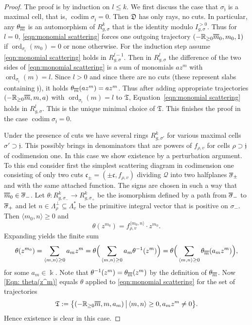 \documentclass[11pt,letter]{amsart}
\theoremstyle{definition}
\theoremstyle{remark}
\numberwithin{equation}{section}
\numberwithin{figure}{section}
\newcommand{\doublebar}[1]{\shortstack{$\overline{\hphantom{#1}}
	$\\[-4pt] $\overline{#1}$}}
\newcommand{\RR} {\mathbb{R}}
\newcommand {\shQ}  {\mathcal{Q}}
\newcommand {\foT}  {\mathfrak{T}}
\newcommand {\foc}  {\mathfrak{c}}
\newcommand {\foj}  {\mathfrak{j}}
\newcommand {\codim} {\operatorname{codim}}
\newcommand {\kk} {\Bbbk}
\newcommand {\ord}  {\operatorname{ord}}
\newcommand {\D} {\mathfrak D}
\begin{document}
\begin{proof}
The proof is by induction on $l\le k$. We first discuss the case that
$\sigma_\foj$ is a maximal cell, that is, $\codim \sigma_\foj=0$. Then $\D$
has only rays, no cuts. In particular, any $\theta_{\scriptsize\doublebar m}$ is
an automorphism of $R^k_{g,\sigma}$ that is the identity modulo
$I_{g,\sigma}^{>0}$. Thus for $l=0$, \eqref{eqn:monomial scattering} forces one
outgoing trajectory $(-\RR_{\ge 0}\doublebar m_0,m_0,1)$ if
$\ord_{\sigma_\foj}(m_0)=0$ or none otherwise. For the induction step assume
\eqref{eqn:monomial scattering} holds in $R^{l-1}_{g,\sigma}$. Then in
$R^l_{g,\sigma}$ the difference of the two sides of \eqref{eqn:monomial
scattering} is a sum of monomials $a z^m$ with $\ord_{\sigma_\foj} (m)=l$. Since
$l>0$ and since there are no cuts (these represent slabs containing $\foj$), it
holds $\theta_{\scriptsize\doublebar m}(a z^m)=a z^m$. Thus after adding
appropriate trajectories $(-\RR_{\ge0}\doublebar m,m,a)$ with
$\ord_{\sigma_\foj}(m)=l$ to $\foT$, Equation~\eqref{eqn:monomial scattering}
holds in $R^l_{g,\sigma}$. This is the unique minimal choice of $\foT$. This finishes the proof in the case $\codim\sigma_\foj=0$.

Under the presence of cuts we have several rings $R^k_{g,\sigma'}$ for various
maximal cells $\sigma'\supset\foj$. This possibly brings in denominators that
are powers of $f_{\rho,v}$ for cells $\rho\supset \foj$ of codimension one. In
this case we show existence by a perturbation argument. To this end consider
first the simplest scattering diagram in codimension one consisting of only two
cuts $\foc_\pm=(\pm \foc,f_{\rho,v})$ dividing $\shQ$ into two halfplanes
$\doublebar\sigma_\pm$ and with the same attached function. The signs are chosen
in such a way that $\doublebar m_0\in \doublebar \sigma_-$. Let $\theta:
R^k_{g,\sigma_-}\to R^k_{g,\sigma_+}$ be the isomorphism defined by a path from
$\doublebar \sigma_-$ to $\doublebar \sigma_+$ and let
$n\in\Lambda_\rho^\perp\subseteq \Lambda_v^*$ be the primitive integral vector
that is positive on $\sigma_-$. Then $\langle m_0,n \rangle \ge 0$ and
\[
\theta(z^{m_0})= f_{\rho,v}^{\langle  m_0,n\rangle} \cdot z^{m_0}.
\]
Expanding yields the finite sum
\begin{equation}
\label{Eqn: theta(z^m)}
\theta(z^{m_0})= \sum_{\langle m,n\rangle\ge 0} a_m z^m
= \theta\Big(\sum_{\langle m,n\rangle\ge 0} a_m
\theta^{-1}(z^m)\Big)
=\theta\Big(\sum_{\langle m,n\rangle\ge 0}
\theta_{\scriptsize\doublebar m}(a_m z^m)\Big),
\end{equation}
for some $a_m\in\kk$. Note that $\theta^{-1}(z^m)=\theta_{\scriptsize\doublebar
m}(z^m)$ by the definition of $\theta_{\scriptsize\doublebar m}$. Now
\eqref{Eqn: theta(z^m)} equals $\theta$ applied to \eqref{eqn:monomial
scattering} for the set of trajectories
\[
\foT:=\big\{(-\RR_{\ge0}\doublebar m,m,a_m)\,\big|\,\langle
m,n\rangle\ge 0, a_mz^m\neq 0 \big\}.
\]
Hence existence is clear in this case.


\end{proof}
\end{document}
